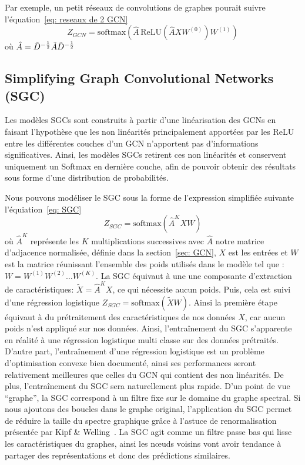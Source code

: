\documentclass[a4paper]{article}
\begin{document}
Par exemple, un petit réseaux de convolutions de graphes pourait suivre l'équation~\ref{eq: reseaux de 2 GCN}
\begin{equation}
    Z_{GCN} = \text{softmax}(\hat{A}\,\text{ReLU}(\hat{A}XW^{(0)})W^{(1)})
    \label{eq: reseaux de 2 GCN}
\end{equation}
où $\hat{A} = \Tilde{D}^{-\frac{1}{2}} \Tilde{A} \Tilde{D}^{-\frac{1}{2}}$


\subsection{Simplifying Graph Convolutional Networks (SGC)}

Les modèles SGCs sont construits à partir d'une linéarisation des GCNs en faisant l'hypothèse que les non linéarités 
principalement apportées par les ReLU entre les différentes couches d'un GCN n'apportent pas d'informations significatives.
Ainsi, les modèles SGCs retirent ces non linéarités et conservent uniquement un Softmax en dernière couche, afin de pouvoir 
obtenir des résultats sous forme d'une distribution de probabilités.

Nous pouvons modéliser le SGC sous la forme de l'expression simplifiée suivante l'équiation~\ref{eq: SGC}
\begin{equation}
  Z_{SGC}=\text{softmax}(\hat{A}^KXW)
  \label{eq: SGC}
\end{equation}
où $\hat{A}^K$ représente les $K$ multiplications successives avec $\hat{A}$ notre matrice d'adjacence normalisée,
définie dans la section~\ref{sec: GCN}, $X$ est les entrées 
et $W$ est la matrice réunissant l'ensemble des poids utilisés dans le modèle tel que : $W=W^{(1)} W^{(2)} \dots W^{(K)}$.
La SGC équivaut à une une composante d'extraction de caractéristiques: $\tilde{X}=\hat{A}^KX$, ce qui nécessite aucun 
poids. Puis, cela est suivi d'une régression logistique $Z_{SGC}=\text{softmax}(\tilde{X}W)$. Ainsi la première étape équivaut 
à du prétraitement des caractéristiques de nos données $X$, car aucun poids n'est appliqué sur nos données. Ainsi, l'entraînement
du SGC s'apparente en réalité à une régression logistique multi classe sur des données prétraités. 
D'autre part, l'entraînement d'une régression logistique est un problème d'optimisation convexe bien documenté, ainsi ses 
performances seront relativement meilleures que celles du GCN qui contient des non linéarités. De plus, l'entraînement du 
SGC sera naturellement plus rapide.
D'un point de vue “graphe”, la SGC correspond à un filtre fixe sur le domaine du graphe spectral. Si nous ajoutons des boucles 
dans le graphe original, l'application du SGC permet de réduire la taille du spectre graphique grâce à l'astuce de renormalisation 
présentée par Kipf \& Welling~\cite{DBLP:journals/corr/KipfW16}. La SGC agit comme un filtre passe bas qui lisse les 
caractéristiques du graphes, ainsi les 
nœuds voisins vont avoir tendance à partager des représentations et donc des prédictions similaires. 
\end{document}
